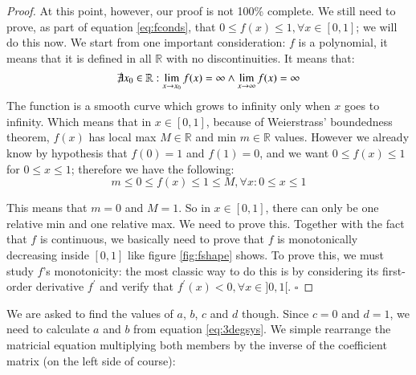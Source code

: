 \begin{proposition}
\begin{proof}
At this point, however, our proof is not 100\% complete. We still need to prove,
as part of equation \ref{eq:fconds}, that 
$0 \leq f(x) \leq 1, \forall x \in [0,1]$; we will do this now. We start from one
important consideration: $f$ is a polynomial, it means that it is defined in all
$\mathbb{R}$ with no discontinuities. It means that:
\begin{equation*}
\not\exists x_0 \in \mathbb{R} : \lim_{x \to x_0} f(x) = \infty \wedge
\lim_{x \to \infty} f(x) = \infty
\end{equation*}
The function is a smooth curve which grows to infinity only when $x$ goes to
infinity. Which means that in $x \in [0,1]$, because of Weierstrass'
boundedness theorem, $f(x)$ has local max $M \in \mathbb{R}$ 
and min $m \in \mathbb{R}$ values. However we already know by hypothesis that
$f(0) = 1$ and $f(1) = 0$, and we want $0 \leq f(x) \leq 1$ for $0 \leq x \leq 1$;
therefore we have the following:
\begin{equation*}
m \leq 0 \leq f(x) \leq 1 \leq M, \forall x : 0 \leq x \leq 1
\end{equation*}
%

%
This means that $m=0$ and $M = 1$. So in $x\in[0,1]$, there can only be one
relative min and one relative max. We need to prove this. Together
with the fact that $f$ is continuous, we basically need to prove that $f$ is
monotonically decreasing inside $[0,1]$ like figure \ref{fig:fshape} shows. To
prove this, we must study $f$'s monotonicity: the most classic way to do this
is by considering its first-order derivative $f^\prime$ and verify that
$f^\prime(x) < 0, \forall x \in ]0,1[$.
$\square$
\end{proof}
\end{proposition}
We are asked to find the values of $a$, $b$, $c$ and $d$ though. Since $c=0$ and
$d=1$, we need to calculate $a$ and $b$ from equation \ref{eq:3degsys}.
We simple rearrange the matricial equation multiplying both members by the
inverse of the coefficient matrix (on the left side of course):
